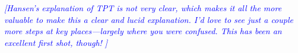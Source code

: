 \documentclass[letterpaper,twocolumn,amsmath,amssymb,prb]{revtex4-1}
\newcommand{\1}{\ensuremath{\textbf{r}_1}}
\newcommand{\2}{\ensuremath{\textbf{r}_2}}
\newcommand{\3}{\ensuremath{\textbf{r}_3}}
\newcommand{\4}{\ensuremath{\textbf{r}_4}}
\newcommand{\davidsays}[1]{\textcolor{blue}{\textit{[#1]}}}
\begin{document}

\davidsays{Hansen's explanation of TPT is not very clear, which makes
  it all the more valuable to make \emph{this} a clear and lucid
  explanation.  I'd love to see just a couple more steps at key
  places---largely where you were confused. This
  has been an excellent first shot, though! }
\end{document}
